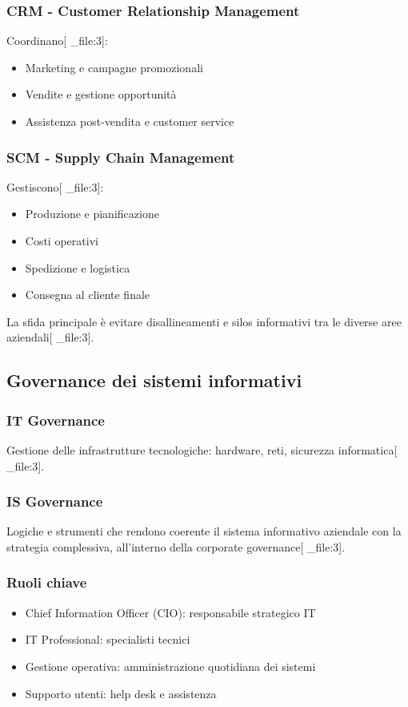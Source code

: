 \documentclass[12pt,a4paper]{article}
\begin{document}
\subsubsection{CRM - Customer Relationship Management}
Coordinano[ _file:3]:
\begin{itemize}
    \item Marketing e campagne promozionali
    \item Vendite e gestione opportunità
    \item Assistenza post-vendita e customer service
\end{itemize}

\subsubsection{SCM - Supply Chain Management}
Gestiscono[ _file:3]:
\begin{itemize}
    \item Produzione e pianificazione
    \item Costi operativi
    \item Spedizione e logistica
    \item Consegna al cliente finale
\end{itemize}

La sfida principale è evitare disallineamenti e silos informativi tra le diverse aree aziendali[ _file:3].

\subsection{Governance dei sistemi informativi}

\subsubsection{IT Governance}
Gestione delle infrastrutture tecnologiche: hardware, reti, sicurezza informatica[ _file:3].

\subsubsection{IS Governance}
Logiche e strumenti che rendono coerente il sistema informativo aziendale con la strategia complessiva, all'interno della corporate governance[ _file:3].

\subsubsection{Ruoli chiave}
\begin{itemize}
    \item Chief Information Officer (CIO): responsabile strategico IT
    \item IT Professional: specialisti tecnici
    \item Gestione operativa: amministrazione quotidiana dei sistemi
    \item Supporto utenti: help desk e assistenza
\end{itemize}
\end{document}
